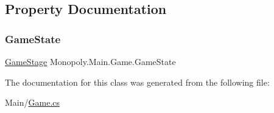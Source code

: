 \subsection{Property Documentation}
\mbox{\label{class_monopoly_1_1_main_1_1_game_a40a5d10028e3f69cd01cef1b513fcc48}} 
\subsubsection{\texorpdfstring{Game\+State}{GameState}}
{\footnotesize\ttfamily \mbox{\hyperlink{class_monopoly_1_1_main_1_1_game_a52e7aaac8429c63b99ced40e268d03e2}{Game\+Stage}} Monopoly.\+Main.\+Game.\+Game\+State\hspace{0.3cm}{\ttfamily [get]}}



The documentation for this class was generated from the following file\+:\begin{DoxyCompactItemize}
\item 
Main/\mbox{\hyperlink{_game_8cs}{Game.\+cs}}\end{DoxyCompactItemize}
